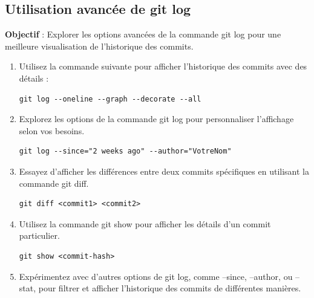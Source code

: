 \newpage

\subsection*{Utilisation avancée de git log}
{}
\noindent \textbf{Objectif} : Explorer les options avancées de la commande git log pour une meilleure visualisation de l'historique des commits.

\begin{enumerate}
	\item Utilisez la commande suivante pour afficher l'historique des commits avec des détails :
	\begin{verbatim}
git log --oneline --graph --decorate --all
	\end{verbatim}
	\item Explorez les options de la commande git log pour personnaliser l'affichage selon vos besoins.
	\begin{verbatim}
git log --since="2 weeks ago" --author="VotreNom"		
	\end{verbatim}
	\item Essayez d'afficher les différences entre deux commits spécifiques en utilisant la commande git diff.
	\begin{verbatim}
git diff <commit1> <commit2>
	\end{verbatim}
	\item Utilisez la commande git show pour afficher les détails d'un commit particulier.
	\begin{verbatim}
git show <commit-hash>
	\end{verbatim}
	\item Expérimentez avec d'autres options de git log, comme --since, --author, ou --stat, pour filtrer et afficher l'historique des commits de différentes manières.
\end{enumerate}

